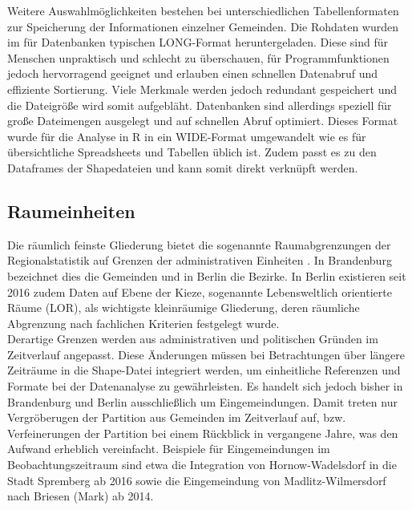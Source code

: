 Weitere Auswahlmöglichkeiten bestehen bei unterschiedlichen Tabellenformaten zur Speicherung der Informationen einzelner Gemeinden. 
Die Rohdaten wurden im für Datenbanken typischen LONG-Format heruntergeladen.  
Diese sind für Menschen unpraktisch und schlecht zu überschauen, 
für Programmfunktionen jedoch hervorragend geeignet und erlauben einen schnellen Datenabruf und effiziente Sortierung. 
Viele Merkmale werden jedoch redundant gespeichert und die Dateigröße wird somit aufgebläht. 
Datenbanken sind allerdings speziell für große Dateimengen ausgelegt und auf schnellen Abruf optimiert. 
Dieses Format wurde für die Analyse in R in ein WIDE-Format umgewandelt wie es für übersichtliche Spreadsheets und Tabellen üblich ist. 
Zudem passt es zu den Dataframes der Shapedateien und kann somit direkt verknüpft werden.

\subsection{Raumeinheiten}

Die räumlich feinste Gliederung bietet die sogenannte \glqq Raumabgrenzungen der Regionalstatistik auf Grenzen der administrativen Einheiten \grqq. 
In Brandenburg bezeichnet dies die Gemeinden und in Berlin die Bezirke. 
In Berlin existieren seit 2016 zudem Daten auf Ebene der Kieze, sogenannte \glqq Lebensweltlich orientierte Räume \grqq (LOR), 
als wichtigste kleinräumige Gliederung, deren räumliche Abgrenzung nach fachlichen Kriterien festgelegt wurde. \\

Derartige Grenzen werden aus administrativen und politischen Gründen im Zeitverlauf angepasst. 
Diese Änderungen müssen bei Betrachtungen über längere Zeiträume in die Shape-Datei integriert werden, um einheitliche Referenzen und Formate bei der Datenanalyse zu gewährleisten. 
Es handelt sich jedoch bisher in Brandenburg und Berlin ausschließlich um Eingemeindungen.
Damit treten nur Vergröberugen der Partition aus Gemeinden im Zeitverlauf auf, bzw. Verfeinerungen der Partition bei einem Rückblick in vergangene Jahre, was den Aufwand erheblich vereinfacht.
Beispiele für Eingemeindungen im Beobachtungszeitraum sind etwa die Integration von \glqq Hornow-Wadelsdorf\grqq{} in die Stadt Spremberg ab 2016 sowie die Eingemeindung von
\glqq Madlitz-Wilmersdorf\grqq{} nach \glqq Briesen (Mark)\grqq{} ab 2014.


